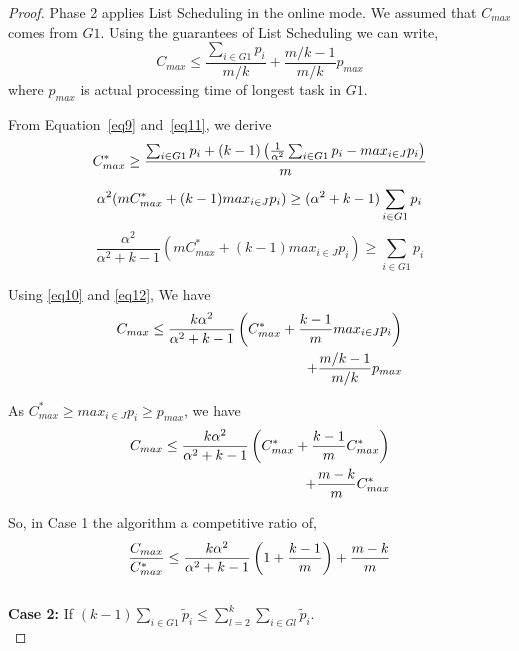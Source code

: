 \documentclass[10pt, conference, compsocconf]{IEEEtran}
\begin{document}
\begin{proof}
  Phase 2 applies List Scheduling in the online mode. We assumed that
  $C_{max}$ comes from $G1$. Using the guarantees of List Scheduling
  we can write,
  \begin{equation}\label{eq10}
    C_{max} \leq \frac{\sum_{i \in G1 }^{}{{p_{i}}}}{m/k} + {\frac{m/k-1}{m/k}} p_{max}
  \end{equation}
  where $p_{max}$ is actual processing time of longest task in $G1$.

  From Equation~\ref{eq9} and~\ref{eq11}, we derive
  \begin{equation}{\nonumber}
    C_{max}^{*} \geq  \frac{\sum_{i \in G1 }^{}{{p_{i}}}+ (k-1)\left(\frac{1}{\alpha^{2}}\sum_{i \in G1 }^{}{{p_{i}}}-  {max_{i \in J}}{{p_{i}}}\right)}{m}
  \end{equation}
  \begin{equation}{\nonumber}
    \alpha^{2} (mC_{max}^{*} + (k-1){max_{i \in J}}{{p_{i}}}) \geq  (\alpha^{2} + k-1) \sum_{i \in G1 }^{}{{p_{i}}}  
  \end{equation}
  \begin{equation}\label{eq12}
    \frac{\alpha^{2}}{\alpha^{2}+k-1}\left(m C_{max}^{*}+(k-1) {max_{i \in J}}{{p_{i}}}\right) \geq \sum_{i \in G1 }^{}{{p_{i}}}  
  \end{equation}
  
  Using \ref{eq10} and \ref{eq12}, We have
  \begin{align}{\nonumber}
    C_{max} \leq \frac{k\alpha^{2}}{\alpha^{2}+k-1}\left( C_{max}^{*}+\frac{k-1}{m} {max_{i \in J}}{{p_{i}}}\right)\\
    + {\frac{m/k-1}{m/k}} p_{max} \nonumber
  \end{align}
  
  As $C_{max}^{*}\geq {{max_{i \in J}}{p_{i}}}\geq p_{max}$, we have
  \begin{align}{\nonumber}
    C_{max} \leq \frac{k\alpha^{2}}{\alpha^{2}+k-1}\left( C_{max}^{*}+ {\frac{k-1}{m}}{C_{max}^{*}}\right)\\
    + {\frac{m-k}{m}} C_{max}^{*} \nonumber
  \end{align}    
  
  So, in Case 1 the algorithm a competitive ratio of,
  \begin{equation}{\nonumber}
    \frac{C_{max}}{C_{max}^{*}} \leq \frac{k\alpha^{2}}{\alpha^{2}+k-1}\left( 1+ {\frac{k-1}{m}} \right) + {\frac{m-k}{m}} \end{equation}\\
  
  \textbf{Case 2:} If $(k-1)\sum_{i \in G1 }^{}{\tilde p_{i}} \leq \sum_{l=2}^{k}\sum_{i \in Gl }^{}{\tilde p_{i}}$. \\
  

\end{proof}
\end{document}
